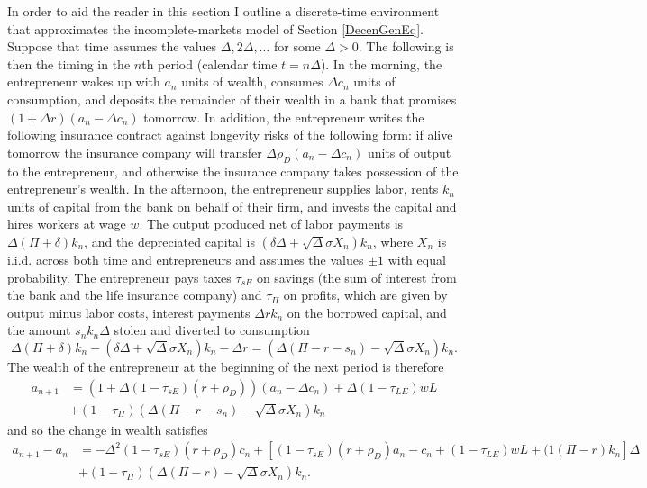 \documentclass[11pt]{article}
\theoremstyle{plain}
\theoremstyle{definition} %
\begin{document}
In order to aid the reader in this section I outline a discrete-time environment that approximates the incomplete-markets model of Section \ref{DecenGenEq}. Suppose that time assumes the values $\Delta, 2\Delta, \dots$ for some $\Delta >0$. The following is then the timing in the $n$th period (calendar time $t = n\Delta$). In the morning, the entrepreneur wakes up with $a_n$ units of wealth, consumes $\Delta c_n$ units of consumption, and deposits the remainder of their wealth in a bank that promises $(1+\Delta r)(a_n - \Delta c_n)$ tomorrow. In addition, the entrepreneur writes the following insurance contract against longevity risks of the following form: if alive tomorrow the insurance company will transfer $\Delta\rho_D(a_n - \Delta c_n)$ units of output to the entrepreneur, and otherwise the insurance company takes possession of the entrepreneur's wealth. In the afternoon, the entrepreneur supplies labor, rents $k_n$ units of capital from the bank on behalf of their firm, and invests the capital and hires workers at wage $w$. The output produced net of labor payments is $\Delta (\Pi + \delta) k_n$, and the depreciated capital is $(\delta \Delta + \sqrt{\Delta}\sigma X_n)k_n$, where $X_n$ is i.i.d. across both time and entrepreneurs and assumes the values $\pm 1$ with equal probability. The entrepreneur pays taxes $\tau_{sE}$ on savings (the sum of interest from the bank and the life insurance company) and $\tau_{\Pi}$ on profits, which are given by output minus labor costs, interest payments $\Delta rk_n$ on the borrowed capital, and the amount $s_nk_n\Delta$ stolen and diverted to consumption
$$
\Delta (\Pi + \delta) k_n - (\delta \Delta + \sqrt{\Delta}\sigma X_n)k_n - \Delta r = {\left(\Delta (\Pi - r - s_n) - \sqrt{\Delta}\sigma X_n\right)} k_n.
$$
The wealth of the entrepreneur at the beginning of the next period is therefore
\begin{align*}
a_{n+1} & = (1+ \Delta (1-\tau_{sE}) (r+\rho_D)) (a_n - \Delta c_n) + \Delta (1-\tau_{LE})wL
\\ & + (1-\tau_{\Pi}){\left(\Delta (\Pi - r - s_n) - \sqrt{\Delta}\sigma X_n\right)} k_n
\end{align*}
and so the change in wealth satisfies
\begin{align*}
a_{n+1}-a_n & = -\Delta^2(1-\tau_{sE}) (r+\rho_D) c_n + {\left[ (1-\tau_{sE})(r+\rho_D)a_n - c_n + (1-\tau_{LE})wL + (1(\Pi - r)k_n\right]}\Delta 
\\ & + (1-\tau_{\Pi}){\left(\Delta (\Pi - r) - \sqrt{\Delta}\sigma X_n\right)} k_n.
\end{align*}
\end{document}
